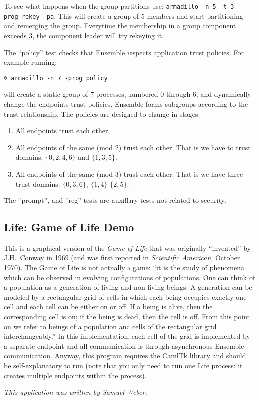 To see what happens when the group partitions use: {\tt armadillo -n 5
-t 3 -prog rekey -pa}. This will create a group of 5 members and start
partitioning and remerging the group. Everytime the membership in a
group component exceeds 3, the component leader will try rekeying it. 

The ``policy'' test checks that Ensemble respects application trust
policies. For example running:
\begin{verbatim}
% armadillo -n 7 -prog policy
\end{verbatim}
will create a static group of 7 processes, numbered 0 through 6, and
dynamically change the endpoints trust policies. Ensemble forms
subgroups according to the trust relationship. The policies are
designed to change in stages:
\begin{enumerate}
\item All endpoints trust each other.
\item 
All endpoints of the same (mod 2) trust each other. That is we
have to trust domains: $\{0,2,4,6\}$ and $\{1,3,5\}$.
\item 
All endpoints of the same (mod 3) trust each other. That is we
have three trust domains: $\{0,3,6\}$, $\{1,4\}$ $\{2,5\}$.
\end{enumerate}

The ``prompt'', and ``reg'' tests are auxillary tests not related
to security. 


\subsection{Life: Game of Life Demo}
This is a graphical version of the \emph{Game of Life} that was
originally ``invented'' by J.H.~Conway in 1969 (and was first
reported in \emph{Scientific American}, October 1970).  The Game of
Life is not actually a game: ``it is the study of phenomena which can
be observed in evolving configurations of populations.  One can think
of a population as a generation of living and non-living beings.  A
generation can be modeled by a rectangular grid of cells in which
each being occupies exactly one cell and each cell can be either on
or off.  If a being is alive, then the corresponding cell is on; if
the being is dead, then the cell is off.  From this point on we refer
to beings of a population and cells of the rectangular grid
interchangeably.''  In this implementation, each cell of the grid is
implemented by a separate endpoint and all communication is through
asynchronous Ensemble communication.  Anyway, this program requires
the CamlTk library and should be self-explanatory to run (note that
you only need to run one Life process: it creates multiple endpoints
within the process).

\emph{This application was written by Samuel Weber.}




